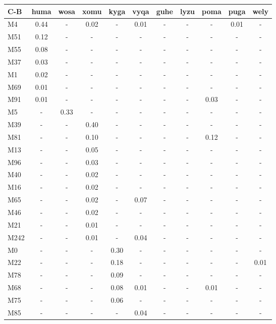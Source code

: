 \begin{table}[h]
\centering
{\footnotesize\begin{tabular}{||l|c|c|c|c|c|c|c|c|c|c||}
\hline\hline
C-B & huma & wosa & xomu & kyga & vyqa & guhe & lyzu & poma & puga & wely\\\hline
M4 & 0.44 & - & 0.02 & - & 0.01 & - & - & - & 0.01 & -\\\hline
M51 & 0.12 & - & - & - & - & - & - & - & - & -\\\hline
M55 & 0.08 & - & - & - & - & - & - & - & - & -\\\hline
M37 & 0.03 & - & - & - & - & - & - & - & - & -\\\hline
M1 & 0.02 & - & - & - & - & - & - & - & - & -\\\hline
M69 & 0.01 & - & - & - & - & - & - & - & - & -\\\hline
M91 & 0.01 & - & - & - & - & - & - & 0.03 & - & -\\\hline
M5 & - & 0.33 & - & - & - & - & - & - & - & -\\\hline
M39 & - & - & 0.40 & - & - & - & - & - & - & -\\\hline
M81 & - & - & 0.10 & - & - & - & - & 0.12 & - & -\\\hline
M13 & - & - & 0.05 & - & - & - & - & - & - & -\\\hline
M96 & - & - & 0.03 & - & - & - & - & - & - & -\\\hline
M40 & - & - & 0.02 & - & - & - & - & - & - & -\\\hline
M16 & - & - & 0.02 & - & - & - & - & - & - & -\\\hline
M65 & - & - & 0.02 & - & 0.07 & - & - & - & - & -\\\hline
M46 & - & - & 0.02 & - & - & - & - & - & - & -\\\hline
M21 & - & - & 0.01 & - & - & - & - & - & - & -\\\hline
M242 & - & - & 0.01 & - & 0.04 & - & - & - & - & -\\\hline
M0 & - & - & - & 0.30 & - & - & - & - & - & -\\\hline
M22 & - & - & - & 0.18 & - & - & - & - & - & 0.01\\\hline
M78 & - & - & - & 0.09 & - & - & - & - & - & -\\\hline
M68 & - & - & - & 0.08 & 0.01 & - & - & 0.01 & - & -\\\hline
M75 & - & - & - & 0.06 & - & - & - & - & - & -\\\hline
M85 & - & - & - & - & 0.04 & - & - & - & - & -\\\hline

\end{tabular}}
\end{table}
